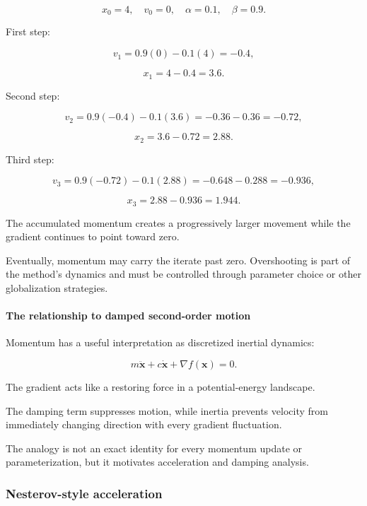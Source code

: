 \[
x_0=4,\quad v_0=0,\quad\alpha=0.1,\quad\beta=0.9.
\]

First step:

\[
v_1=0.9(0)-0.1(4)=-0.4,
\]

\[
x_1=4-0.4=3.6.
\]

Second step:

\[
v_2=0.9(-0.4)-0.1(3.6) =-0.36-0.36=-0.72,
\]

\[
x_2=3.6-0.72=2.88.
\]

Third step:

\[
v_3=0.9(-0.72)-0.1(2.88) =-0.648-0.288=-0.936,
\]

\[
x_3=2.88-0.936=1.944.
\]

The accumulated momentum creates a progressively larger movement while the gradient continues to point toward zero.

Eventually, momentum may carry the iterate past zero. Overshooting is part of the method's dynamics and must be controlled through parameter choice or other globalization strategies.

\paragraph{The relationship to damped second-order motion}\label{02-foundations-ii-ch026-the-relationship-to-damped-second-order-motion}

\hypertarget{02-foundations-ii-ch026-the-relationship-to-damped-second-order-motion}{}

Momentum has a useful interpretation as discretized inertial dynamics:

\[
m\ddot{\mathbf x} +c\dot{\mathbf x} +\nabla f(\mathbf x)=0.
\]

The gradient acts like a restoring force in a potential-energy landscape.

The damping term suppresses motion, while inertia prevents velocity from immediately changing direction with every gradient fluctuation.

The analogy is not an exact identity for every momentum update or parameterization, but it motivates acceleration and damping analysis.

\subsubsection{Nesterov-style acceleration}\label{02-foundations-ii-ch026-nesterov-style-acceleration}

\hypertarget{02-foundations-ii-ch026-nesterov-style-acceleration}{}

